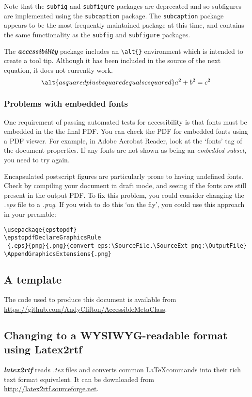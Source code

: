 \documentclass[12pt,letterpaper]{article}
\newcommand{\fn}[1]{\emph{#1}}
\newcommand{\packagename}[1]{\textbf{\emph{#1}}}
\begin{document}
Note that the \texttt{subfig} and \texttt{subfigure} packages are deprecated and so subfigures are implemented using the \texttt{subcaption} package. The \texttt{subcaption} package appears to be the most frequently maintained package at this time, and contains the same functionality as the \texttt{subfig} and \texttt{subfigure} packages.

The \packagename{accessibility} package includes an \verb+\alt{}+ environment which is intended to create a tool tip. Although it has been included in the source of the next equation, it does not currently work.
\begin{equation}
\alt{a squared plus b squared equals c squared}
a^2+b^2=c^2
\end{equation}

\subsubsection{Problems with embedded fonts}
One requirement of passing automated tests for accessibility is that fonts must be embedded in the the final PDF. You can check the PDF for embedded fonts using a PDF viewer. For example, in Adobe Acrobat Reader, look at the `fonts' tag of the document properties. If any fonts are not shown as being an \emph{embedded subset}, you need to try again. 

Encapsulated postscript figures are particularly prone to having undefined fonts. Check by compiling your document in draft mode, and seeing if the fonts are still present in the output PDF. To fix this problem, you could consider changing the \emph{.eps} file to a \emph{.png}. If you wish to do this `on the fly', you could use this approach in your preamble:

\begin{verbatim}
\usepackage{epstopdf}
\epstopdfDeclareGraphicsRule
 {.eps}{png}{.png}{convert eps:\SourceFile.\SourceExt png:\OutputFile}
\AppendGraphicsExtensions{.png}
\end{verbatim}

\subsection{A template}
The code used to produce this document is available from \href{https://github.com/AndyClifton/AccessibleMetaClass}{https://github.com/AndyClifton/AccessibleMetaClass}. 

\subsection{Changing to a WYSIWYG-readable format using Latex2rtf}
\packagename{latex2rtf} reads \fn{.tex} files and converts common \LaTeX commands into their rich text format equivalent. It can be downloaded from \url{http://latex2rtf.sourceforge.net}.
\end{document}
